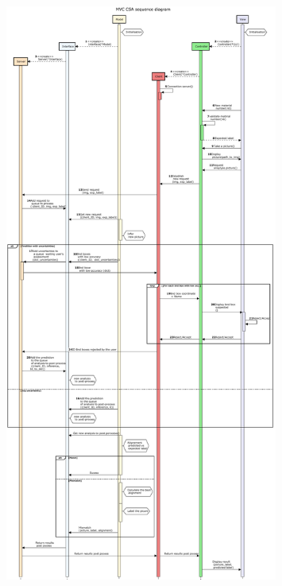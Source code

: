 \documentclass[12pt, french, a4paper]{article} %
\begin{document}
\begin{figure}[H]
 \centering
  \includegraphics[width=0.8\textwidth, height=1\textheight]{figure/sequence_diagram.pdf}
  \clearpage 
  \vspace{-.7cm}
  \caption{}
 \label{Seqenc_diagram}
\end{figure}
\end{document}
